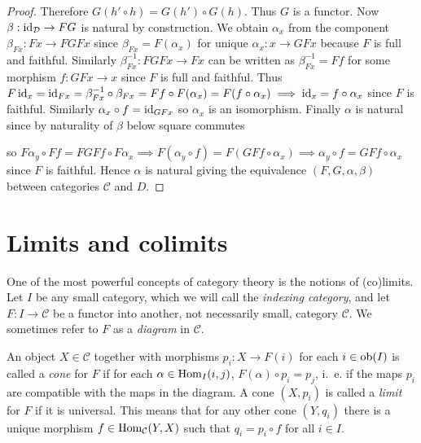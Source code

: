 \documentclass[a4paper,openany]{scrbook}
\renewcommand{\C}{\mathcal C}
\begin{document}
\begin{proof}
Therefore $G(h' \circ h) = G(h') \circ G(h)$. Thus $G$ is a functor. Now $\beta: \operatorname{id}_\mathcal D \to FG$ is natural by construction. We obtain $\alpha_x$ from the component $\beta_{Fx}: Fx \to FGFx$ since $\beta_{Fx} = F(\alpha_x)$ for unique $\alpha_x: x \to GFx$ because $F$ is full and faithful. Similarly $\beta_{Fx}^{-1} : FGFx \to Fx$ can be written as $\beta_{Fx}^{-1} = Ff$ for some morphism $f:GFx \to x$ since $F$ is full and faithful. Thus $F\operatorname{id}_x = \operatorname{id}_{Fx} = \beta_{Fx}^{-1} \circ \beta_{Fx} = Ff \circ F(\alpha_x) = F(f \circ \alpha_x) \implies \operatorname{id}_x = f \circ \alpha_x$ since $F$ is faithful. Similarly $\alpha_x \circ f = \operatorname{id}_{GFx}$ so $\alpha_x$ is an isomorphism. Finally $\alpha$ is natural since by naturality of $\beta$ below square commutes
\begin{center}
\end{center} \noindent
so $F\alpha_y \circ Ff = FGFf \circ F \alpha_x \implies F(\alpha_y \circ f) = F(GFf \circ \alpha_x) \implies \alpha_y \circ f = GFf \circ \alpha_x$ since $F$ is faithful. Hence $\alpha$ is natural giving the equivalence $(F,G, \alpha, \beta)$ between categories $\C$ and $D$.
\end{proof}

\section{Limits and colimits}\label{app:limits}

One of the most powerful concepts of category theory is the notions of (co)limits. Let $I$ be any small category, which we will call the \emph{indexing category}, and let $F\colon I \to \C$ be a functor into another, not necessarily small, category $\C$. We sometimes refer to $F$ as a \emph{diagram} in $\C$.

\begin{defn} An object $X \in \C$ together with morphisms $p_i\colon X \to F(i)$ for each $i \in \operatorname{ob}(I)$ is called a \emph{cone} for $F$ if for each $\alpha \in \operatorname{Hom}_I(i,j)$, $F(\alpha) \circ p_i = p_j$, i.~e. if the maps $p_i$ are compatible with the maps in the diagram. A cone $(X,p_i)$ is called a \emph{limit} for $F$ if it is universal. This means that for any other cone $(Y,q_i)$ there is a unique morphism $f \in \Hom_\C(Y,X)$ such that $q_i = p_i \circ f$ for all $i \in I$.
\end{defn}
\end{document}
